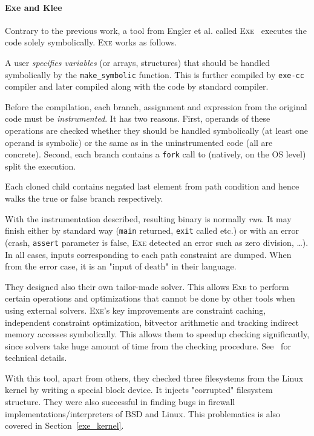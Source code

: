 \documentclass[11pt,a4paper]{article}
\begin{document}
\paragraph{Exe and Klee} Contrary to the previous work, a tool from Engler et
al. called \textsc{Exe}~\cite{exe} executes the code solely symbolically.
\textsc{Exe} works as follows.

A user \emph{specifies variables} (or arrays, structures) that should be
handled symbolically by the \texttt{make\_symbolic} function. This is further
compiled by \texttt{exe-cc} compiler and later compiled along with the code by
standard compiler.

Before the compilation, each branch, assignment and expression from the
original code must be \emph{instrumented}. It has two reasons. First,
operands of these operations are checked whether they should be handled
symbolically (at least one operand is symbolic) or the same as in the
uninstrumented code (all are concrete). Second, each branch contains a
\texttt{fork} call to (natively, on the OS level) split the execution.

Each cloned child contains negated last element from path condition and hence
walks the true or false branch respectively.

With the instrumentation described, resulting binary is normally \emph{run}.
It may finish either by standard way (\texttt{main} returned, \texttt{exit}
called etc.) or with an error (crash, \texttt{assert} parameter is false,
\textsc{Exe} detected an error such as zero division, \ldots). In all cases,
inputs corresponding to each path constraint are dumped. When from the error
case, it is an "input of death" in their language.

They designed also their own tailor-made solver. This allows \textsc{Exe} to
perform certain operations and optimizations that cannot be done by other
tools when using external solvers. \textsc{Exe}'s key improvements are
constraint caching, independent constraint optimization, bitvector arithmetic
and tracking indirect memory accesses symbolically. This allows them to
speedup checking significantly, since solvers take huge amount of time from
the checking procedure. See~\cite{exe} for technical details.

With this tool, apart from others, they checked three filesystems from the
Linux kernel by writing a special block device. It injects "corrupted"
filesystem structure. They were also successful in finding bugs in firewall
implementations/interpreters of BSD and Linux. This problematics is also
covered in Section~\ref{exe_kernel}.
\end{document}

